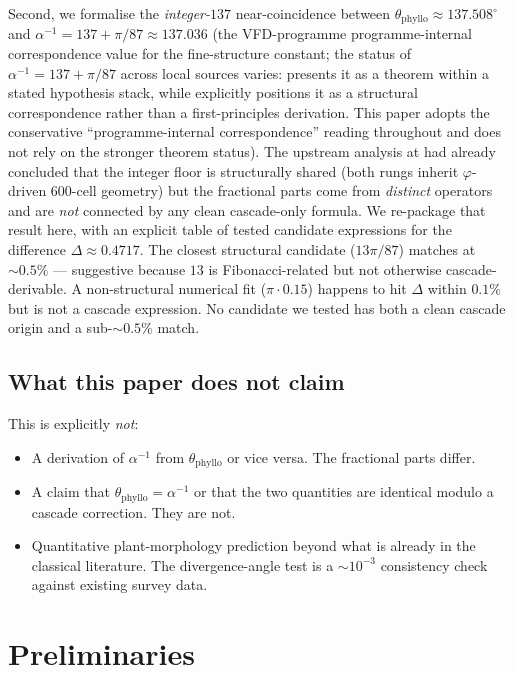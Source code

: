 \documentclass[12pt]{article}
\newcommand{\phig}{\varphi}
\begin{document}
Second, we formalise the \emph{integer-$137$} near-coincidence
between $\theta_{\mathrm{phyllo}} \approx 137.508^{\circ}$ and
$\alpha^{-1} = 137 + \pi/87 \approx 137.036$ (the VFD-programme
programme-internal correspondence value for the fine-structure
constant; the status of $\alpha^{-1} = 137 + \pi/87$ across local
sources varies: \cite{CascadeAlphaChain} presents it as a
theorem within a stated hypothesis stack, while
\cite{SmartXXII} explicitly positions it as a structural
correspondence rather than a first-principles derivation. This
paper adopts the conservative ``programme-internal correspondence''
reading throughout and does not rely on the stronger theorem
status). The upstream analysis at
\cite[\S B6.1--B6.2]{CascadeBio} had already concluded that the
integer floor is structurally shared (both rungs inherit $\phig$-
driven $600$-cell geometry) but the fractional parts come from
\emph{distinct} operators and are \emph{not} connected by any clean
cascade-only formula. We re-package that result here, with an
explicit table of tested candidate expressions for the difference
$\Delta \approx 0.4717$. The closest structural candidate
($13\pi/87$) matches at $\sim 0.5\%$ --- suggestive because $13$
is Fibonacci-related but not otherwise cascade-derivable. A
non-structural numerical fit ($\pi\cdot 0.15$) happens to hit
$\Delta$ within $0.1\%$ but is not a cascade expression. No
candidate we tested has both a clean cascade origin and a
sub-$\sim 0.5\%$ match.

\subsection{What this paper does not claim}

This is explicitly \emph{not}:
\begin{itemize}
\item A derivation of $\alpha^{-1}$ from $\theta_{\mathrm{phyllo}}$
  or vice versa. The fractional parts differ.
\item A claim that $\theta_{\mathrm{phyllo}} = \alpha^{-1}$ or that
  the two quantities are identical modulo a cascade correction.
  They are not.
\item Quantitative plant-morphology prediction beyond what is already
  in the classical literature. The divergence-angle test is a
  $\sim 10^{-3}$ consistency check against existing survey data.
\end{itemize}

\section{Preliminaries}\label{sec:prelim}
\end{document}
